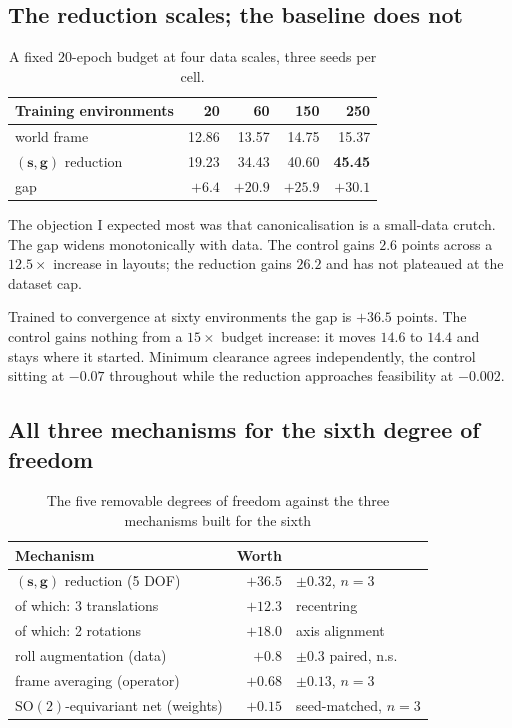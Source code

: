 \documentclass[11pt,a4paper]{article}
\newcommand{\toprule}{\hline}
\newcommand{\midrule}{\hline}
\newcommand{\bottomrule}{\hline}
\newcommand{\svec}{\mathbf{s}}
\newcommand{\gvec}{\mathbf{g}}
\newcommand{\SO}{\mathrm{SO}}
\begin{document}
\subsection{The reduction scales; the baseline does not}

\begin{table}[t]
\centering\small
\begin{tabular}{lrrrr}
\toprule
Training environments & 20 & 60 & 150 & 250 \\
\midrule
world frame           & 12.86 & 13.57 & 14.75 & 15.37 \\
$(\svec,\gvec)$ reduction & 19.23 & 34.43 & 40.60 & \textbf{45.45} \\
\midrule
gap                   & $+6.4$ & $+20.9$ & $+25.9$ & $\mathbf{+30.1}$ \\
\bottomrule
\end{tabular}
\caption{A fixed $20$-epoch budget at four data scales, three seeds per cell.}
\label{tab:scaling}
\end{table}

The objection I expected most was that canonicalisation is a small-data crutch.
The gap widens monotonically with data. The control gains $2.6$ points across a
$12.5\times$ increase in layouts; the reduction gains $26.2$ and has not
plateaued at the dataset cap.

Trained to convergence at sixty environments the gap is $+36.5$ points.
The control gains nothing from a $15\times$ budget increase: it moves $14.6$ to
$14.4$ and stays where it started. Minimum clearance agrees independently, the
control sitting at $-0.07$ throughout while the reduction approaches feasibility
at $-0.002$.

\subsection{All three mechanisms for the sixth degree of freedom}

\begin{table}[t]
\centering\small
\begin{tabular}{lrl}
\toprule
Mechanism & Worth & \\
\midrule
$(\svec,\gvec)$ reduction (5 DOF) & $+36.5$ & $\pm 0.32$, $n=3$ \\
\quad of which: 3 translations    & $+12.3$ & recentring \\
\quad of which: 2 rotations       & $+18.0$ & axis alignment \\
\midrule
roll augmentation (data)          & $+0.8$  & $\pm 0.3$ paired, n.s. \\
frame averaging (operator)        & $+0.68$ & $\pm 0.13$, $n=3$ \\
$\SO(2)$-equivariant net (weights)& $+0.15$ & seed-matched, $n=3$ \\
\bottomrule
\end{tabular}
\caption{The five removable degrees of freedom against the three mechanisms
built for the sixth}
\label{tab:mechanisms}
\end{table}
\end{document}
